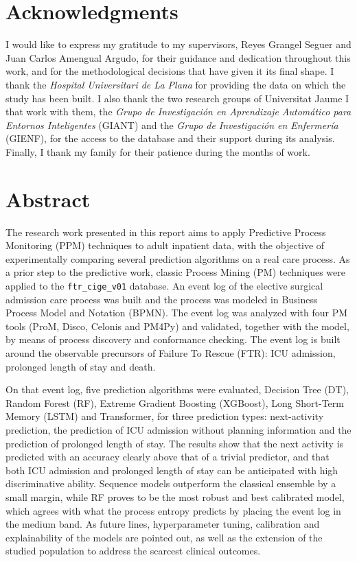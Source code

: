 \documentclass[a4paper,11pt,oneside]{book}
\newcommand{\code}[1]{\texttt{#1}}
\begin{document}
\chapter*{Acknowledgments}
I would like to express my gratitude to my supervisors, Reyes Grangel Seguer and Juan Carlos Amengual Argudo, for their guidance and dedication throughout this work, and for the methodological decisions that have given it its final shape. I thank the \emph{Hospital Universitari de La Plana} for providing the data on which the study has been built. I also thank the two research groups of Universitat Jaume I that work with them, the \emph{Grupo de Investigaci\'on en Aprendizaje Autom\'atico para Entornos Inteligentes} (GIANT) and the \emph{Grupo de Investigaci\'on en Enfermer\'ia} (GIENF), for the access to the database and their support during its analysis. Finally, I thank my family for their patience during the months of work.

\cleardoublepage
\chapter*{Abstract}
The research work presented in this report aims to apply Predictive Process Monitoring (PPM) techniques to adult inpatient data, with the objective of experimentally comparing several prediction algorithms on a real care process. As a prior step to the predictive work, classic Process Mining (PM) techniques were applied to the \code{ftr\_cige\_v01} database. An event log of the elective surgical admission care process was built and the process was modeled in Business Process Model and Notation (BPMN). The event log was analyzed with four PM tools (ProM, Disco, Celonis and PM4Py) and validated, together with the model, by means of process discovery and conformance checking. The event log is built around the observable precursors of Failure To Rescue (FTR): ICU admission, prolonged length of stay and death.

On that event log, five prediction algorithms were evaluated, Decision Tree (DT), Random Forest (RF), Extreme Gradient Boosting (XGBoost), Long Short-Term Memory (LSTM) and Transformer, for three prediction types: next-activity prediction, the prediction of ICU admission without planning information and the prediction of prolonged length of stay. The results show that the next activity is predicted with an accuracy clearly above that of a trivial predictor, and that both ICU admission and prolonged length of stay can be anticipated with high discriminative ability. Sequence models outperform the classical ensemble by a small margin, while RF proves to be the most robust and best calibrated model, which agrees with what the process entropy predicts by placing the event log in the medium band. As future lines, hyperparameter tuning, calibration and explainability of the models are pointed out, as well as the extension of the studied population to address the scarcest clinical outcomes.
\end{document}
